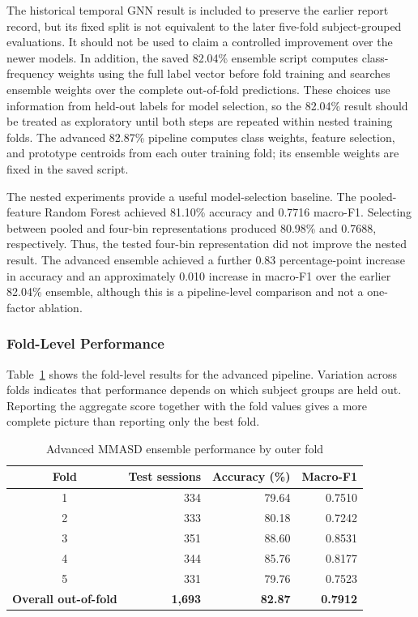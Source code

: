 \documentclass[a4paper,12pt]{report}
\begin{document}
The historical temporal GNN result is included to preserve the earlier report record, but its fixed split is not equivalent to the later five-fold subject-grouped evaluations. It should not be used to claim a controlled improvement over the newer models. In addition, the saved 82.04\% ensemble script computes class-frequency weights using the full label vector before fold training and searches ensemble weights over the complete out-of-fold predictions. These choices use information from held-out labels for model selection, so the 82.04\% result should be treated as exploratory until both steps are repeated within nested training folds. The advanced 82.87\% pipeline computes class weights, feature selection, and prototype centroids from each outer training fold; its ensemble weights are fixed in the saved script.

The nested experiments provide a useful model-selection baseline. The pooled-feature Random Forest achieved 81.10\% accuracy and 0.7716 macro-F1. Selecting between pooled and four-bin representations produced 80.98\% and 0.7688, respectively. Thus, the tested four-bin representation did not improve the nested result. The advanced ensemble achieved a further 0.83 percentage-point increase in accuracy and an approximately 0.010 increase in macro-F1 over the earlier 82.04\% ensemble, although this is a pipeline-level comparison and not a one-factor ablation.

\subsubsection*{Fold-Level Performance}

Table~\ref{tab:mmasd_folds} shows the fold-level results for the advanced pipeline. Variation across folds indicates that performance depends on which subject groups are held out. Reporting the aggregate score together with the fold values gives a more complete picture than reporting only the best fold.

\begin{table}[htbp]
\centering
\small
\caption{Advanced MMASD ensemble performance by outer fold}
\label{tab:mmasd_folds}
\begin{tabular}{crrr}
\hline
\textbf{Fold} & \textbf{Test sessions} & \textbf{Accuracy (\%)} & \textbf{Macro-F1} \\
\hline
1 & 334 & 79.64 & 0.7510 \\
2 & 333 & 80.18 & 0.7242 \\
3 & 351 & 88.60 & 0.8531 \\
4 & 344 & 85.76 & 0.8177 \\
5 & 331 & 79.76 & 0.7523 \\
\textbf{Overall out-of-fold} & \textbf{1,693} & \textbf{82.87} & \textbf{0.7912} \\
\hline
\end{tabular}
\end{table}
\end{document}
